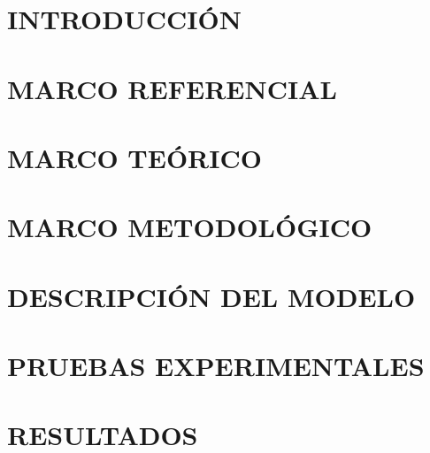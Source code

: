 \documentclass[letterpaper,titlepage,12pt,oneside,spanish,final]{report_eie}
\numberwithin{equation}{chapter}%
\numberwithin{figure}{chapter}%
\numberwithin{table}{chapter}%
\numberwithin{definition}{chapter}%
\numberwithin{lemma}{chapter}%
\numberwithin{theorem}{chapter}%
\numberwithin{corollary}{chapter}%
\numberwithin{condition}{chapter}%
\numberwithin{criterion}{chapter}%
\numberwithin{problem}{chapter}%
\numberwithin{property}{chapter}%
\numberwithin{proposition}{chapter}%
\numberwithin{solution}{chapter}%
\numberwithin{conjecture}{chapter}%
\begin{document}
\chapter*{INTRODUCCIÓN}\label{CAP:intro}
\setlength{\parskip}{14pt}%
%

%
%

\chapter{MARCO REFERENCIAL}\label{CAP:marcoref}
%

\chapter{MARCO TEÓRICO}\label{CAP:teor}
%

\chapter{MARCO METODOLÓGICO}\label{CAP:met}
%

\chapter{DESCRIPCIÓN DEL MODELO}\label{CAP:mod}
%

\chapter{PRUEBAS EXPERIMENTALES}\label{CAP:exp}
%

\chapter{RESULTADOS}\label{CAP:resultados}
%
\end{document}
